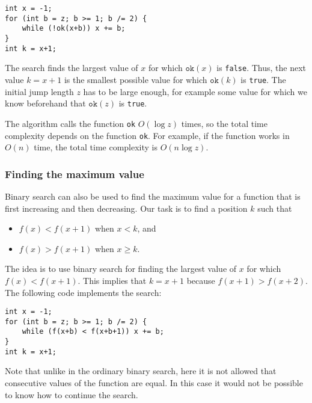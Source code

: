 \begin{lstlisting}
int x = -1;
for (int b = z; b >= 1; b /= 2) {
    while (!ok(x+b)) x += b;
}
int k = x+1;
\end{lstlisting}

The search finds the largest value of $x$ for which
$\texttt{ok}(x)$ is \texttt{false}.
Thus, the next value $k=x+1$
is the smallest possible value for which
$\texttt{ok}(k)$ is \texttt{true}.
The initial jump length $z$ has to be
large enough, for example some value
for which we know beforehand that $\texttt{ok}(z)$ is \texttt{true}.

The algorithm calls the function \texttt{ok}
$O(\log z)$ times, so the total time complexity
depends on the function \texttt{ok}.
For example, if the function works in $O(n)$ time,
the total time complexity is $O(n \log z)$.

\subsubsection{Finding the maximum value}

Binary search can also be used to find
the maximum value for a function that is
first increasing and then decreasing.
Our task is to find a position $k$ such that

\begin{itemize}
\item
$f(x)<f(x+1)$ when $x<k$, and
\item
$f(x)>f(x+1)$ when $x \ge k$.
\end{itemize}

The idea is to use binary search
for finding the largest value of $x$
for which $f(x)<f(x+1)$.
This implies that $k=x+1$
because $f(x+1)>f(x+2)$.
The following code implements the search: 

\begin{lstlisting}
int x = -1;
for (int b = z; b >= 1; b /= 2) {
    while (f(x+b) < f(x+b+1)) x += b;
}
int k = x+1;
\end{lstlisting}

Note that unlike in the ordinary binary search,
here it is not allowed that consecutive values
of the function are equal.
In this case it would not be possible to know
how to continue the search.
